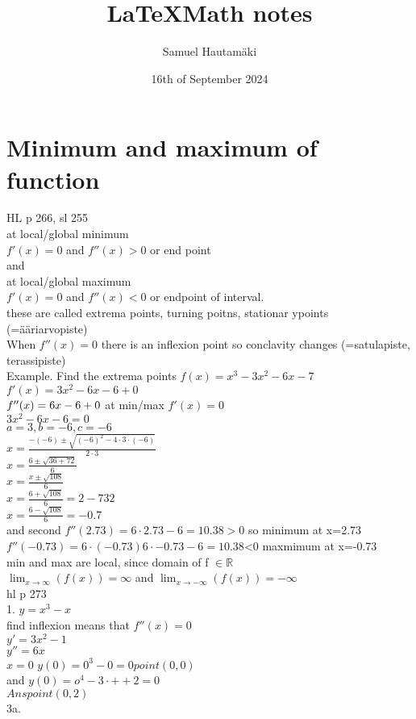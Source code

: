 \documentclass{article}
\title{\LaTeX Math notes}
\author{Samuel Hautamäki}
\date{16th of September 2024}
\begin{document}
  \maketitle
   
  \section{Minimum and maximum of function}
  HL p 266, sl 255\\
  at local/global minimum\\
  $f'(x)=0$ and $f''(x)>0$ or end point\\
  and\\
  at local/global maximum\\
  $f'(x)=0$ and $f''(x)<0$ or endpoint of interval.\\
  these are called extrema points, turning poitns, stationar ypoints (=ääriarvopiste)\\
  When $f''(x)=0$ there is an inflexion point so conclavity changes (=satulapiste, terassipiste)\\
  Example. Find the extrema points $f(x)=x^3-3x^2-6x-7$\\
  $f'(x)=3x^2-6x-6+0$\\   
  $f''(x)=6x-6+0\\$
  at min/max $f'(x)=0$\\
  $3x^2-6x-6=0$\\
  $a=3,b=-6,c=-6$\\
  $x=\frac{-(-6)\pm\sqrt{(-6)^2-4\cdot3\cdot(-6)}}{2\cdot3}$\\
  $x=\frac{6\pm\sqrt{36+72}}{6}$\\
  $x=\frac{x\pm\sqrt{108}}{6}$\\
  $x=\frac{6+\sqrt{108}}{6}=2-732$\\
  $x=\frac{6-\sqrt{108}}{6}=-0.7$\\
  and second $f''(2.73)=6\cdot2.73-6=10.38>0$ so minimum at x=2.73\\
  $f''(-0.73)=6\cdot(-0.73)6\cdot-0.73-6=10.38$<0 maxmimum at x=-0.73\\
  min and max are local, since domain of f $\in\mathbb{R}$\\
  $\lim_{x\to\infty}(f(x))=\infty$ and $\lim_{x\to-\infty}(f(x))=-\infty$\\
  hl p 273\\
  1. $y=x^3-x$\\
  find inflexion means that $f''(x)=0$\\
  $y'=3x^2-1$\\
  $y''=6x$\\
  $x=0$ $y(0)=0^3-0=0 point (0,0)$\\
  and $y(0)=o^4-3\cdot++2=0$\\
  $Ans point (0,2)$\\
  3a.  
   
\end{document}
